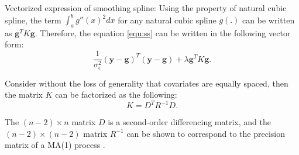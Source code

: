 \documentclass{beamer} %
\begin{document}
\begin{frame}

\begin{block}{Vectorized expression of smoothing spline:}
Using the property of natural cubic spline, the term $\int_a^b g''(x)^2 dx$ for any natural cubic spline $g(.)$ can be written as $\boldsymbol{g}^T K \boldsymbol{g}$.
Therefore, the equation \ref{equ:ss} can be written in the following vector form:
\pause
\begin{equation}\label{equ:vectorss}
\frac{1}{ \sigma_\epsilon^2}(\boldsymbol{y} - \boldsymbol{g})^T (\boldsymbol{y} - \boldsymbol{g}) + \lambda \boldsymbol{g}^T K \boldsymbol{g}.
\end{equation}
\end{block}

\pause

Consider without the loss of generality that covariates are equally spaced, then the matrix $K$ can be factorized as the following:
\pause
\begin{equation}\label{equ:ArimaPrior}
K = D^T R^{-1} D.
\end{equation}

\pause

The $(n-2) \times n$ matrix $D$ is a second-order differencing matrix, and the $(n-2) \times (n-2)$ matrix $R^{-1}$ can be shown to correspond to the precision matrix of a MA(1) process \citep{ARIMA}.



\end{frame}
\end{document}
